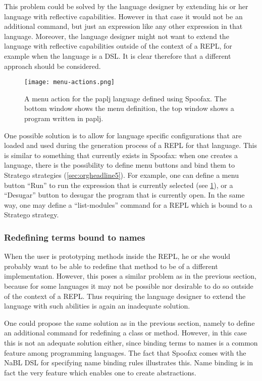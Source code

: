 This problem could be solved by the language designer by extending his
or her language with reflective capabilities. However in that case it
would not be an additional command, but just an expression like any
other expression in that language. Moreover, the language designer
might not want to extend the language with reflective capabilities
outside of the context of a REPL, for example when the language is a
DSL. It is clear therefore that a different approach should be
considered.

\begin{figure}[htbp]
  \centering
  \texttt{[image: menu-actions.png]}
  \caption{A menu action for the paplj language defined using
    Spoofax. The bottom window shows the menu definition, the top
    window shows a program written in paplj.}
  \label{fig:menu-actions}
\end{figure}

One possible solution is to allow for language specific configurations
that are loaded and used during the generation process of a REPL for
that language. This is similar to something that currently exists in
Spoofax: when one creates a language, there is the possibility to
define menu buttons and bind them to Stratego strategies
(\cref{sec:orgheadline5}). For example, one can define a menu button
``Run'' to run the expression that is currently selected (see
\cref{fig:menu-actions}), or a ``Desugar'' button to desugar the
program that is currently open. In the same way, one may define a
``list-modules'' command for a REPL which is bound to a Stratego
strategy.

\subsubsection{Redefining terms bound to names}
\label{sec:redef-cont-bound}
When the user is prototyping methods inside the REPL, he or she would
probably want to be able to redefine that method to be of a different
implementation. However, this poses a similar problem as in the
previous section, because for some languages it may not be possible
nor desirable to do so outside of the context of a REPL. Thus
requiring the language designer to extend the language with such
abilities is again an inadequate solution.

One could propose the same solution as in the previous section, namely
to define an additional command for redefining a class or
method. However, in this case this is not an adequate solution either,
since binding terms to names is a common feature among programming
languages. The fact that Spoofax comes with the NaBL DSL for
specifying name binding rules illustrates this. Name binding is in
fact the very feature which enables one to create abstractions.

